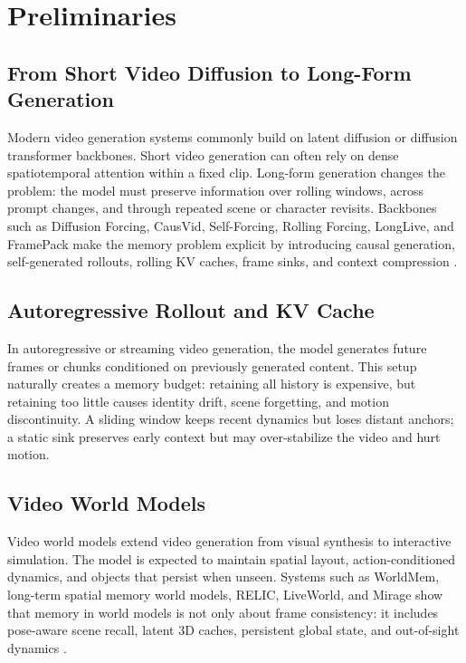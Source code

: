 \section{Preliminaries}

\subsection{From Short Video Diffusion to Long-Form Generation}

Modern video generation systems commonly build on latent diffusion or diffusion transformer backbones. Short video generation can often rely on dense spatiotemporal attention within a fixed clip. Long-form generation changes the problem: the model must preserve information over rolling windows, across prompt changes, and through repeated scene or character revisits. Backbones such as Diffusion Forcing, CausVid, Self-Forcing, Rolling Forcing, LongLive, and FramePack make the memory problem explicit by introducing causal generation, self-generated rollouts, rolling KV caches, frame sinks, and context compression \citep{diffusionforcing2024,causvid2024,selfforcing2025,rollingforcing2025,longlive2025,framepack2025}.

\subsection{Autoregressive Rollout and KV Cache}

In autoregressive or streaming video generation, the model generates future frames or chunks conditioned on previously generated content. This setup naturally creates a memory budget: retaining all history is expensive, but retaining too little causes identity drift, scene forgetting, and motion discontinuity. A sliding window keeps recent dynamics but loses distant anchors; a static sink preserves early context but may over-stabilize the video and hurt motion.

\subsection{Video World Models}

Video world models extend video generation from visual synthesis to interactive simulation. The model is expected to maintain spatial layout, action-conditioned dynamics, and objects that persist when unseen. Systems such as WorldMem, long-term spatial memory world models, RELIC, LiveWorld, and Mirage show that memory in world models is not only about frame consistency: it includes pose-aware scene recall, latent 3D caches, persistent global state, and out-of-sight dynamics \citep{worldmem2025,spmem2025,relic2025,liveworld2026,mirage2026}.
